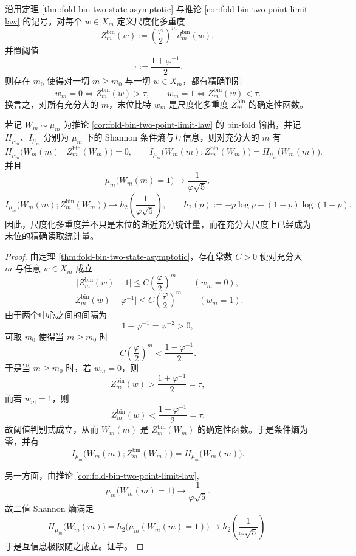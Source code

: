 \begin{theorem}\label{thm:xi-foldbin-lastbit-complete-readout-statistic}
沿用定理 \ref{thm:fold-bin-two-state-asymptotic} 与推论 \ref{cor:fold-bin-two-point-limit-law} 的记号。对每个 \(w\in X_m\) 定义尺度化多重度
\[
Z_m^{\mathrm{bin}}(w):=\left(\frac{\varphi}{2}\right)^m d_m^{\mathrm{bin}}(w),
\]
并置阈值
\[
\tau:=\frac{1+\varphi^{-1}}{2}.
\]
则存在 \(m_0\) 使得对一切 \(m\ge m_0\) 与一切 \(w\in X_m\)，都有精确判别
\[
\boxed{\;
w_m=0 \iff Z_m^{\mathrm{bin}}(w)>\tau,
\qquad
w_m=1 \iff Z_m^{\mathrm{bin}}(w)<\tau.
\;}
\]
换言之，对所有充分大的 \(m\)，末位比特 \(w_m\) 是尺度化多重度 \(Z_m^{\mathrm{bin}}\) 的确定性函数。

若记 \(W_m\sim \mu_m\) 为推论 \ref{cor:fold-bin-two-point-limit-law} 的 bin-fold 输出，并记 \(H_{\mu_m}\)、\(I_{\mu_m}\) 分别为 \(\mu_m\) 下的 Shannon 条件熵与互信息，则对充分大的 \(m\) 有
\[
H_{\mu_m}\!\bigl(W_m(m)\mid Z_m^{\mathrm{bin}}(W_m)\bigr)=0,
\qquad
I_{\mu_m}\!\bigl(W_m(m);Z_m^{\mathrm{bin}}(W_m)\bigr)=H_{\mu_m}\!\bigl(W_m(m)\bigr).
\]
并且
\[
\mu_m\bigl(W_m(m)=1\bigr)\longrightarrow \frac{1}{\varphi\sqrt5},
\]
\[
I_{\mu_m}\!\bigl(W_m(m);Z_m^{\mathrm{bin}}(W_m)\bigr)\longrightarrow
h_2\!\left(\frac{1}{\varphi\sqrt5}\right),
\qquad
h_2(p):=-p\log p-(1-p)\log(1-p).
\]
因此，尺度化多重度并不只是末位的渐近充分统计量，而在充分大尺度上已经成为末位的精确读取统计量。
\end{theorem}
\begin{proof}
由定理 \ref{thm:fold-bin-two-state-asymptotic}，存在常数 \(C>0\) 使对充分大 \(m\) 与任意 \(w\in X_m\) 成立
\[
\bigl|Z_m^{\mathrm{bin}}(w)-1\bigr|
\le
C\left(\frac{\varphi}{2}\right)^m
\qquad (w_m=0),
\]
\[
\bigl|Z_m^{\mathrm{bin}}(w)-\varphi^{-1}\bigr|
\le
C\left(\frac{\varphi}{2}\right)^m
\qquad (w_m=1).
\]
由于两个中心之间的间隔为
\[
1-\varphi^{-1}=\varphi^{-2}>0,
\]
可取 \(m_0\) 使得当 \(m\ge m_0\) 时
\[
C\left(\frac{\varphi}{2}\right)^m<\frac{1-\varphi^{-1}}{2}.
\]
于是当 \(m\ge m_0\) 时，若 \(w_m=0\)，则
\[
Z_m^{\mathrm{bin}}(w)>\frac{1+\varphi^{-1}}{2}=\tau,
\]
而若 \(w_m=1\)，则
\[
Z_m^{\mathrm{bin}}(w)<\frac{1+\varphi^{-1}}{2}=\tau.
\]
故阈值判别式成立，从而 \(W_m(m)\) 是 \(Z_m^{\mathrm{bin}}(W_m)\) 的确定性函数。于是条件熵为零，并有
\[
I_{\mu_m}\!\bigl(W_m(m);Z_m^{\mathrm{bin}}(W_m)\bigr)
=
H_{\mu_m}\!\bigl(W_m(m)\bigr).
\]

另一方面，由推论 \ref{cor:fold-bin-two-point-limit-law},
\[
\mu_m\bigl(W_m(m)=1\bigr)\longrightarrow \frac{1}{\varphi\sqrt5}.
\]
故二值 Shannon 熵满足
\[
H_{\mu_m}\!\bigl(W_m(m)\bigr)
=
h_2\!\bigl(\mu_m(W_m(m)=1)\bigr)
\longrightarrow
h_2\!\left(\frac{1}{\varphi\sqrt5}\right).
\]
于是互信息极限随之成立。证毕。
\end{proof}

